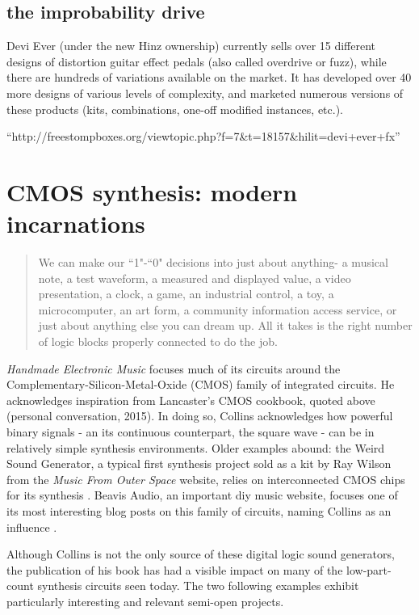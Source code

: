 \subsection{the improbability drive}

Devi Ever (under the new Hinz ownership) currently sells over 15 different designs of distortion guitar effect pedals (also called overdrive or fuzz), while there are hundreds of variations available on the market. It has developed over 40 more designs of various levels of complexity, and marketed numerous versions of these products (kits, combinations, one-off modified instances, etc.).  

``http://freestompboxes.org/viewtopic.php?f=7&t=18157&hilit=devi+ever+fx''

\section{CMOS synthesis: modern incarnations}

\begin{quote}
	
	We can make our ``1"-``0" decisions into just about anything- a musical note, a test waveform, a measured and displayed value, a video presentation, a clock, a game, an industrial control, a toy, a microcomputer, an art form, a community information access service, or just about anything else you can dream up. All it takes is the right number of logic blocks properly connected to do the job.
	\citep[pp-7-8]{lancaster1988}
	
\end{quote}

\emph{Handmade Electronic Music} focuses much of its circuits around the Complementary-Silicon-Metal-Oxide (CMOS) family of integrated circuits. He acknowledges inspiration from Lancaster's CMOS cookbook, quoted above (personal conversation, 2015). In doing so, Collins acknowledges how powerful binary signals - an its continuous counterpart, the square wave - can be in relatively simple synthesis environments. Older examples abound: the Weird Sound Generator, a typical first synthesis project sold as a kit by Ray Wilson from the \emph{Music From Outer Space} website, relies on interconnected CMOS chips for its synthesis \citep{wilson2015}. Beavis Audio, an important diy music website, focuses one of its most interesting blog posts on this family of circuits, naming Collins as an influence \citep{beavis2015}. 

Although Collins is not the only source of these digital logic sound generators, the publication of his book has had a visible impact on many of the low-part-count synthesis circuits seen today. The two following examples exhibit particularly interesting and relevant semi-open projects. 

